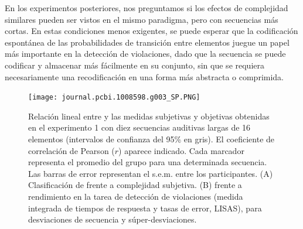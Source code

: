 En los experimentos posteriores, nos preguntamos si los efectos de complejidad similares pueden ser vistos en el mismo paradigma, pero con secuencias más cortas. En estas condiciones menos exigentes, se puede esperar que la codificación espontánea de las probabilidades de transición entre elementos juegue un papel más importante en la detección de violaciones, dado que la secuencia se puede codificar y almacenar más fácilmente en su conjunto, sin que se requiera necesariamente una recodificación en una forma más abstracta o comprimida.

\begin{figure}[t!]
   \texttt{[image: journal.pcbi.1008598.g003\_SP.PNG]}
   \centering
   \caption{Relación lineal entre \mdlbin y las medidas subjetivas y objetivas obtenidas en el experimento 1 con diez secuencias auditivas largas de 16 elementos (intervalos de confianza del 95\% en gris). El coeficiente de correlación de Pearson ($r$) aparece indicado. Cada marcador representa el promedio del grupo para una determinada secuencia. Las barras de error representan el s.e.m. entre los participantes. (A) Clasificación de \mdlbin frente a complejidad subjetiva. (B) \mdlbin frente a rendimiento en la tarea de detección de violaciones (medida integrada de tiempos de respuesta y tasas de error, LISAS), para desviaciones de secuencia y súper-desviaciones.}
   \label{PlosBIO-F3}
\end{figure}

